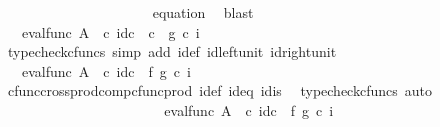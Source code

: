 \begin{isabellebody}
\ \ \ \ \ \ \ \ \ \ \ \ \ \ \ \ \ \ \ \ \isamarkupfalse%
\ equation{}\ \isamarkupfalse%
\ blast\isanewline
\ \ \ \ \ \ \ \ \ \ \ \ \ \ \ \ \ \ \isamarkupfalse%
\ \isamarkupfalse%
\ {\isachardoublequoteopen}{\isachardot}{\kern0pt}{\isachardot}{\kern0pt}{\isachardot}{\kern0pt}\ {\isacharequal}{\kern0pt}\ eval{\isacharunderscore}{\kern0pt}func\ A\ {\isasymOmega}\ {\isasymcirc}\isactrlsub c\ {\isasymlangle}id\isactrlsub c\ {\isasymOmega}\ {\isasymcirc}\isactrlsub c\ \ {\isasymt}{\isacharcomma}{\kern0pt}g\ {\isasymcirc}\isactrlsub c\ i{\isasymrangle}{\isachardoublequoteclose}\isanewline
\ \ \ \ \ \ \ \ \ \ \ \ \ \ \ \ \ \ \ \ \ \ \isamarkupfalse%
\ {\isacharparenleft}{\kern0pt}typecheck{\isacharunderscore}{\kern0pt}cfuncs{\isacharcomma}{\kern0pt}\ simp\ add{\isacharcolon}{\kern0pt}\ i{\isacharunderscore}{\kern0pt}def\ id{\isacharunderscore}{\kern0pt}left{\isacharunderscore}{\kern0pt}unit{}\ id{\isacharunderscore}{\kern0pt}right{\isacharunderscore}{\kern0pt}unit{}{\isacharparenright}{\kern0pt}\isanewline
\ \ \ \ \ \ \ \ \ \ \ \ \ \ \ \ \ \ \isamarkupfalse%
\ \isamarkupfalse%
\ {\isachardoublequoteopen}{\isachardot}{\kern0pt}{\isachardot}{\kern0pt}{\isachardot}{\kern0pt}\ {\isacharequal}{\kern0pt}\ eval{\isacharunderscore}{\kern0pt}func\ A\ {\isasymOmega}\ {\isasymcirc}\isactrlsub c\ {\isacharparenleft}{\kern0pt}{\isacharparenleft}{\kern0pt}id\isactrlsub c\ {\isasymOmega}\ {\isasymtimes}\isactrlsub f\ g{\isacharparenright}{\kern0pt}\ {\isasymcirc}\isactrlsub c\ {\isasymlangle}{\isasymt}{\isacharcomma}{\kern0pt}i{\isasymrangle}{\isacharparenright}{\kern0pt}{\isachardoublequoteclose}\isanewline
\ \ \ \ \ \ \ \ \ \ \ \ \ \ \ \ \ \ \ \ \ \ \isamarkupfalse%
\ cfunc{\isacharunderscore}{\kern0pt}cross{\isacharunderscore}{\kern0pt}prod{\isacharunderscore}{\kern0pt}comp{\isacharunderscore}{\kern0pt}cfunc{\isacharunderscore}{\kern0pt}prod\ i{\isacharunderscore}{\kern0pt}def\ id{}{\isacharunderscore}{\kern0pt}eq\ id{}{\isacharunderscore}{\kern0pt}is\ \isamarkupfalse%
\ {\isacharparenleft}{\kern0pt}typecheck{\isacharunderscore}{\kern0pt}cfuncs{\isacharcomma}{\kern0pt}\ auto{\isacharparenright}{\kern0pt}\isanewline
\ \ \ \ \ \ \ \ \ \ \ \ \ \ \ \ \ \ \isamarkupfalse%
\ \isamarkupfalse%
\ {\isachardoublequoteopen}{\isachardot}{\kern0pt}{\isachardot}{\kern0pt}{\isachardot}{\kern0pt}\ {\isacharequal}{\kern0pt}\ {\isacharparenleft}{\kern0pt}eval{\isacharunderscore}{\kern0pt}func\ A\ {\isasymOmega}\ {\isasymcirc}\isactrlsub c\ {\isacharparenleft}{\kern0pt}id\isactrlsub c\ {\isasymOmega}\ {\isasymtimes}\isactrlsub f\ g{\isacharparenright}{\kern0pt}{\isacharparenright}{\kern0pt}\ {\isasymcirc}\isactrlsub c\ {\isasymlangle}{\isasymt}{\isacharcomma}{\kern0pt}i{\isasymrangle}{\isachardoublequoteclose}\isanewline

\end{isabellebody}
